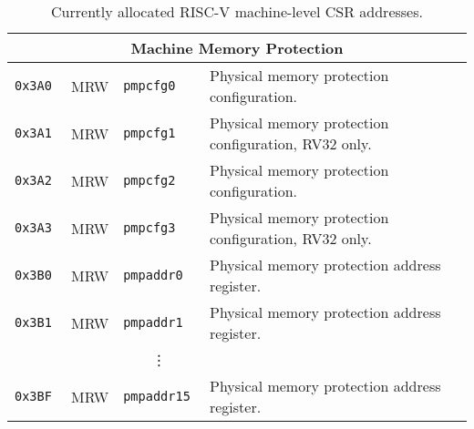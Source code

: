 \begin{table}[htb!]
\begin{center}
\begin{tabular}{|l|l|l|l|}
\hline
\multicolumn{4}{|c|}{Machine Memory Protection} \\
\hline
\tt 0x3A0 & MRW  &\tt pmpcfg0    & Physical memory protection configuration. \\
\tt 0x3A1 & MRW  &\tt pmpcfg1    & Physical memory protection configuration, RV32 only. \\
\tt 0x3A2 & MRW  &\tt pmpcfg2    & Physical memory protection configuration. \\
\tt 0x3A3 & MRW  &\tt pmpcfg3    & Physical memory protection configuration, RV32 only. \\
\tt 0x3B0 & MRW  &\tt pmpaddr0   & Physical memory protection address register. \\
\tt 0x3B1 & MRW  &\tt pmpaddr1   & Physical memory protection address register. \\
& & \multicolumn{1}{c|}{\vdots} & \ \\
\tt 0x3BF & MRW  &\tt pmpaddr15  & Physical memory protection address register. \\
\hline
\end{tabular}
\end{center}
\caption{Currently allocated RISC-V machine-level CSR addresses.}
\label{mcsrnames0}
\end{table}

